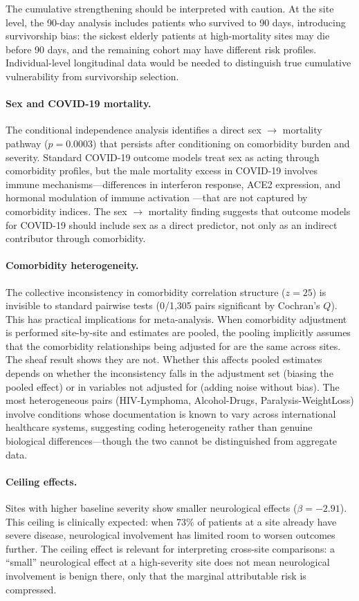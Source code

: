 \documentclass{article}
\begin{document}
The cumulative strengthening should be interpreted with caution. At the site level, the 90-day analysis includes patients who survived to 90 days, introducing survivorship bias: the sickest elderly patients at high-mortality sites may die before 90 days, and the remaining cohort may have different risk profiles. Individual-level longitudinal data would be needed to distinguish true cumulative vulnerability from survivorship selection.

\paragraph{Sex and COVID-19 mortality.} The conditional independence analysis identifies a direct sex $\to$ mortality pathway ($p = 0.0003$) that persists after conditioning on comorbidity burden and severity. Standard COVID-19 outcome models treat sex as acting through comorbidity profiles, but the male mortality excess in COVID-19 involves immune mechanisms---differences in interferon response, ACE2 expression, and hormonal modulation of immune activation \cite{takahashi2020sex}---that are not captured by comorbidity indices. The sex $\to$ mortality finding suggests that outcome models for COVID-19 should include sex as a direct predictor, not only as an indirect contributor through comorbidity.

\paragraph{Comorbidity heterogeneity.} The collective inconsistency in comorbidity correlation structure ($z = 25$) is invisible to standard pairwise tests (0/1,305 pairs significant by Cochran's $Q$). This has practical implications for meta-analysis. When comorbidity adjustment is performed site-by-site and estimates are pooled, the pooling implicitly assumes that the comorbidity relationships being adjusted for are the same across sites. The sheaf result shows they are not. Whether this affects pooled estimates depends on whether the inconsistency falls in the adjustment set (biasing the pooled effect) or in variables not adjusted for (adding noise without bias). The most heterogeneous pairs (HIV-Lymphoma, Alcohol-Drugs, Paralysis-WeightLoss) involve conditions whose documentation is known to vary across international healthcare systems, suggesting coding heterogeneity rather than genuine biological differences---though the two cannot be distinguished from aggregate data.

\paragraph{Ceiling effects.} Sites with higher baseline severity show smaller neurological effects ($\beta = -2.91$). This ceiling is clinically expected: when 73\% of patients at a site already have severe disease, neurological involvement has limited room to worsen outcomes further. The ceiling effect is relevant for interpreting cross-site comparisons: a ``small'' neurological effect at a high-severity site does not mean neurological involvement is benign there, only that the marginal attributable risk is compressed.
\end{document}
